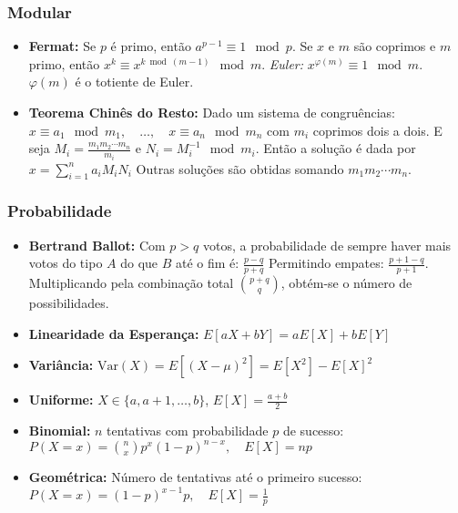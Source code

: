 \begin{small}
\begin{itemize}
\end{itemize}
\subsubsection*{Modular}
\begin{itemize}

    \item \textbf{Fermat:} Se $p$ é primo, então $a^{p-1} \equiv 1 \mod p$. Se $x$ e $m$ são coprimos e $m$ primo, então $x^k \equiv x^{k \bmod (m-1)} \mod m$.
          \textit{Euler:} $x^{\varphi(m)} \equiv 1 \mod m$. $\varphi(m)$ é o totiente de Euler.


    \item \textbf{Teorema Chinês do Resto:} Dado um sistema de congruências:
    $ x \equiv a_1 \mod m_1, \quad \ldots, \quad x \equiv a_n \mod m_n $
    com $m_i$ coprimos dois a dois. E seja $M_i = \frac{m_1 m_2 \cdots m_n}{m_i}$ e $N_i = M_i^{-1} \mod m_i$. Então a solução é dada por $x = \sum_{i=1}^{n} a_i M_i N_i $
    Outras soluções são obtidas somando $m_1 m_2 \cdots m_n$.

\end{itemize}
\subsubsection*{Probabilidade}
\begin{itemize}

    \item \textbf{Bertrand Ballot:} Com $p > q$ votos, a probabilidade de sempre haver mais votos do tipo $A$ do que $B$ até o fim é:
    $ \frac{p - q}{p + q} $
    Permitindo empates: 
    $\frac{p + 1 - q}{p + 1}$. Multiplicando pela combinação total $\binom{p + q}{q}$, obtém-se o número de possibilidades.

    
    \item \textbf{Linearidade da Esperança:} $E[aX + bY] = aE[X] + bE[Y]$

    \item \textbf{Variância:} $\text{Var}(X) = E[(X - \mu)^2] = E[X^2] - E[X]^2$

    \item \textbf{Uniforme:} $X \in \{a, a+1, \dots, b\}$, $E[X] = \frac{a + b}{2}$
        
    \item \textbf{Binomial:} $n$ tentativas com probabilidade $p$ de sucesso:
    $ P(X = x) = \binom{n}{x} p^x (1 - p)^{n - x}, \quad E[X] = np $
    
    \item \textbf{Geométrica:} Número de tentativas até o primeiro sucesso:
    $ P(X = x) = (1 - p)^{x - 1} p, \quad E[X] = \frac{1}{p} $

\end{itemize}
\end{small}
